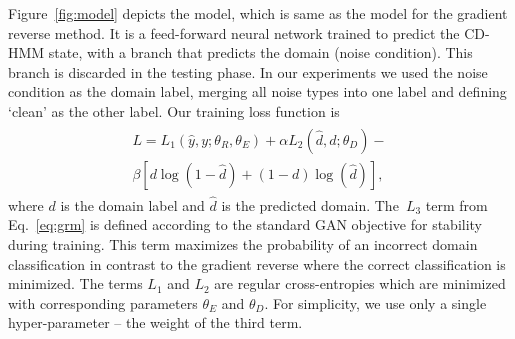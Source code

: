 \documentclass[a4paper]{article}
\begin{document}
Figure~\ref{fig:model} depicts the model, which is same as the model for the 
gradient reverse method. It is a feed-forward neural network trained to predict 
the CD-HMM state, with a branch that predicts the domain (noise condition). This 
branch is discarded in the testing phase. In our experiments we
used the noise condition as the domain label, merging all noise types into one label
and defining `clean' as the other label. Our training loss function is  
\begin{align}
    \begin{split}
    L = L_1(\hat{y}, y; \theta_R, \theta_E) + 
    \alpha L_2(\hat{d}, d; \theta_D) -\\
    \beta [d\log(1 - \hat{d}) + (1-d)\log(\hat{d})],
    \end{split}
    \label{eq:our}
\end{align}
where $d$ is the domain label and $\hat{d}$ is the predicted domain.
The~$L_3$ term from Eq.~\ref{eq:grm} is defined according to the standard GAN
objective for stability during training. 
This term maximizes the probability
of an incorrect domain classification in contrast to the gradient reverse where the 
correct classification is minimized.
The terms $L_1$ and $L_2$ are 
regular cross-entropies which are minimized with corresponding parameters $\theta_E$ and $\theta_D$.
For simplicity, we use only a single hyper-parameter -- the weight of the third term.
\end{document}

